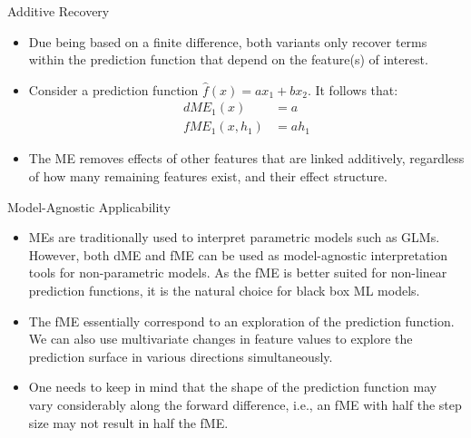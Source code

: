 \documentclass[11pt,compress,t,notes=noshow, aspectratio=169, xcolor=table]{beamer}
\begin{document}
\begin{frame}{Additive Recovery}

\begin{itemize}
\itemsep2em
\item Due being based on a finite difference, both variants only recover terms within the prediction function that depend on the feature(s) of interest.
\item Consider a prediction function $\widehat{f}(x) = ax_1 + bx_2$. It follows that:
\begin{align*}
dME_1(x) &= a \\
fME_1(x, h_1) &= ah_1
\end{align*}
\item The ME removes effects of other features that are linked additively, regardless of how many remaining features exist, and their effect structure.
\end{itemize}

\end{frame}


\begin{frame}{Model-Agnostic Applicability}

\begin{itemize}
\itemsep2em
\item MEs are traditionally used to interpret parametric models such as GLMs. However, both dME and fME can be used as model-agnostic interpretation tools for non-parametric models. As the fME is better suited for non-linear prediction functions, it is the natural choice for black box ML models.
\item The fME essentially correspond to an exploration of the prediction function. We can also use multivariate changes in feature values to explore the prediction surface in various directions simultaneously.
\item One needs to keep in mind that the shape of the prediction function may vary considerably along the forward difference, i.e., an fME with half the step size may not result in half the fME.
\end{itemize}

\end{frame}
\end{document}
